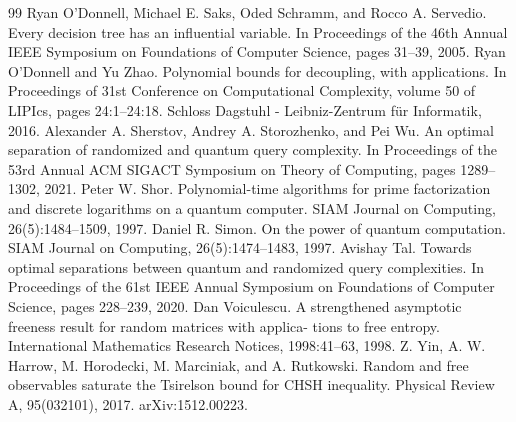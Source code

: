 \begin{thebibliography}{99}
 Ryan O’Donnell, Michael E. Saks, Oded Schramm, and Rocco A. Servedio. Every decision tree has an influential variable. In Proceedings of the 46th Annual IEEE Symposium on Foundations of Computer Science, pages 31–39, 2005.
 Ryan O’Donnell and Yu Zhao. Polynomial bounds for decoupling, with applications. In Proceedings of 31st Conference on Computational Complexity, volume 50 of LIPIcs, pages 24:1–24:18. Schloss Dagstuhl - Leibniz-Zentrum für Informatik, 2016.
 Alexander A. Sherstov, Andrey A. Storozhenko, and Pei Wu. An optimal separation of randomized and quantum query complexity. In Proceedings of the 53rd Annual ACM SIGACT Symposium on Theory of Computing, pages 1289–1302, 2021.
 Peter W. Shor. Polynomial-time algorithms for prime factorization and discrete logarithms on a quantum computer. SIAM Journal on Computing, 26(5):1484–1509, 1997.
 Daniel R. Simon. On the power of quantum computation. SIAM Journal on Computing, 26(5):1474–1483, 1997.
 Avishay Tal. Towards optimal separations between quantum and randomized query complexities. In Proceedings of the 61st IEEE Annual Symposium on Foundations of Computer Science, pages 228–239, 2020.
 Dan Voiculescu. A strengthened asymptotic freeness result for random matrices with applica- tions to free entropy. International Mathematics Research Notices, 1998:41–63, 1998.
 Z. Yin, A. W. Harrow, M. Horodecki, M. Marciniak, and A. Rutkowski. Random and free observables saturate the Tsirelson bound for CHSH inequality. Physical Review A, 95(032101), 2017. arXiv:1512.00223.
\end{thebibliography}

